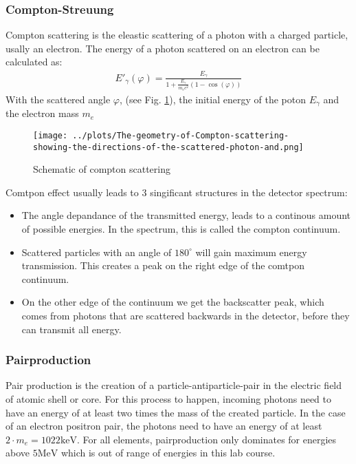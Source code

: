 \subsubsection{Compton-Streuung}

Compton scattering is the eleastic scattering of a photon with a charged particle, usally an electron.
The energy of a photon scattered on an electron can be calculated as:
\begin{gather}
    E'_{\gamma}(\varphi) = \frac{E_{\gamma}}{1 + \frac{E_{\gamma}}{m_{e} c^{2}} (1 - \cos (\varphi))}
\end{gather}
With the scattered angle $\varphi$, (see Fig. \ref{theorie_Compton_Streuuung}), the initial energy of the poton $E_{\gamma}$ and the electron mass $m_e$

\begin{figure}[ht]
	\centering
    \texttt{[image: ../plots/The-geometry-of-Compton-scattering-showing-the-directions-of-the-scattered-photon-and.png]}
	\caption{Schematic of compton scattering \cite{Bild_Compton_Streuung}}
	\label{theorie_Compton_Streuuung}
\end{figure}
Comtpon effect usually leads to 3 singificant structures in the detector spectrum:
\begin{itemize}
\item The angle depandance of the transmitted energy, leads to a continous amount of possible energies. In the spectrum, this is called the compton continuum.
\item Scattered particles with an angle of $180^{\circ}$ will gain maximum energy transmission. This creates a peak on the right edge of the comtpon continuum.
\item On the other edge of the continuum we get the backscatter peak, which comes from photons that are scattered backwards in the detector, before they can transmit all energy.
\end{itemize}

\subsubsection{Pairproduction}

Pair production is the creation of a particle-antiparticle-pair in the electric field of atomic shell or core.
For this process to happen, incoming photons need to have an energy of at least two times the mass of the created particle.
In the case of an electron positron pair, the photons need to have an energy of at least $2 \cdot m_e = 1022 \text{keV}$.
For all elements, pairproduction only dominates for energies above $5 \text{MeV}$ which is out of range of energies in this lab course.
